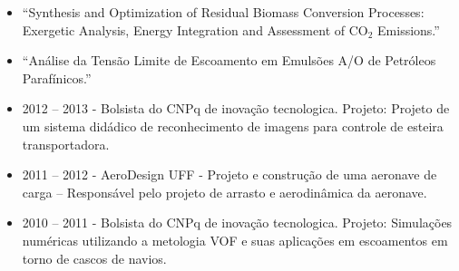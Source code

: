 \documentclass[10pt,a4paper,ragged2e,withhyper]{altacv}
\begin{document}
\begin{paracol}{2}
            \begin{itemize}
                \item “Synthesis and Optimization of Residual Biomass Conversion Processes: Exergetic Analysis, Energy Integration and Assessment of CO$_{2}$ Emissions.”
            \end{itemize}
            
            \divider
            
            \begin{itemize}
                \item “Análise da Tensão Limite de Escoamento em Emulsões A/O de Petróleos Parafínicos.”
            \end{itemize}
             
             \divider
            
            
             \divider
             
            \begin{itemize}
            
                \item 2012 – 2013 - Bolsista do CNPq de inovação tecnologica. Projeto: Projeto de um sistema didádico de reconhecimento de imagens para controle de esteira transportadora.
                
                \item 2011 – 2012 - AeroDesign UFF - Projeto e construção de uma aeronave de carga – Responsável pelo projeto de arrasto e aerodinâmica da aeronave.
                
                \item 2010 – 2011 - Bolsista do CNPq de inovação tecnologica. Projeto: Simulações numéricas utilizando a metologia VOF e suas aplicações em escoamentos em torno de cascos de navios.
            \end{itemize}
        

\end{paracol}
\end{document}
